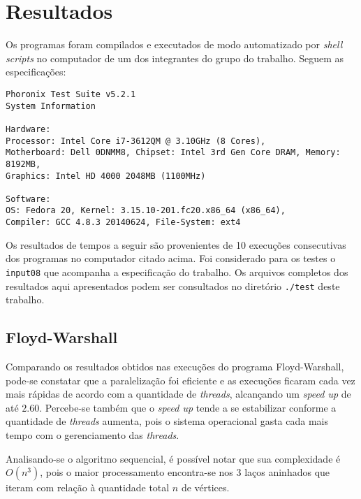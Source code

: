 \section{Resultados}

Os programas foram compilados e executados de modo automatizado por \emph{shell scripts} no computador de um dos integrantes do grupo do trabalho. Seguem as especificações:

\begin{verbatim}Phoronix Test Suite v5.2.1
System Information

Hardware:
Processor: Intel Core i7-3612QM @ 3.10GHz (8 Cores),
Motherboard: Dell 0DNMM8, Chipset: Intel 3rd Gen Core DRAM, Memory: 8192MB,
Graphics: Intel HD 4000 2048MB (1100MHz)

Software:
OS: Fedora 20, Kernel: 3.15.10-201.fc20.x86_64 (x86_64),
Compiler: GCC 4.8.3 20140624, File-System: ext4
\end{verbatim}

Os resultados de tempos a seguir são provenientes de 10 execuções consecutivas dos programas no computador citado acima. Foi considerado para os testes o \texttt{input08} que acompanha a especificação do trabalho. Os arquivos completos dos resultados aqui apresentados podem ser consultados no diretório \texttt{./test} deste trabalho.

\newpage
\subsection{Floyd-Warshall}

Comparando os resultados obtidos nas execuções do programa Floyd-Warshall, pode-se constatar que a paralelização foi eficiente e as execuções ficaram cada vez mais rápidas de acordo com a quantidade de \textit{threads}, alcançando um \textit{speed up} de até $2.60$. Percebe-se também que o \textit{speed up} tende a se estabilizar conforme a quantidade de \textit{threads} aumenta, pois o sistema operacional gasta cada mais tempo com o gerenciamento das \textit{threads}.

Analisando-se o algoritmo sequencial, é possível notar que sua complexidade é $O(n^3)$, pois o maior processamento encontra-se nos 3 laços aninhados que iteram com relação à quantidade total $n$ de vértices.

